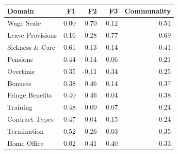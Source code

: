 \begin{tabular}{lrrrr}
    \hline\hline
    Domain & F1 & F2 & F3 & Communality \\
    \hline
    Wage Scale & 0.00 & 0.70 & 0.12 & 0.51 \\
    Leave Provisions & 0.16 & 0.28 & 0.77 & 0.69 \\
    Sickness \& Care & 0.61 & 0.13 & 0.14 & 0.41 \\
    Pensions & 0.44 & 0.14 & 0.06 & 0.21 \\
    Overtime & 0.35 & -0.11 & 0.34 & 0.25 \\
    Bonuses & 0.38 & 0.46 & 0.14 & 0.37 \\
    Fringe Benefits & 0.40 & 0.46 & 0.04 & 0.38 \\
    Training & 0.48 & 0.00 & 0.07 & 0.24 \\
    Contract Types & 0.47 & 0.04 & 0.15 & 0.24 \\
    Termination & 0.52 & 0.26 & -0.03 & 0.35 \\
    Home Office & 0.02 & 0.41 & 0.40 & 0.33 \\
    \hline\hline
\end{tabular}
